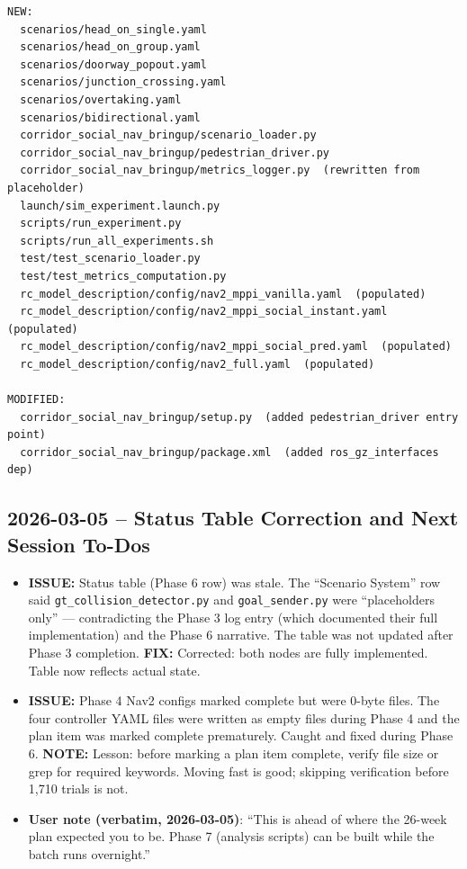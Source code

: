 \documentclass[11pt]{article}
\newcommand{\logentry}[1]{\subsection*{#1}}
\newcommand{\issue}[1]{\textcolor{issuered}{\textbf{ISSUE:} #1}}
\newcommand{\fix}[1]{\textcolor{fixgreen}{\textbf{FIX:} #1}}
\newcommand{\note}[1]{\textcolor{notblue}{\textbf{NOTE:} #1}}
\begin{document}
\begin{verbatim}
NEW:
  scenarios/head_on_single.yaml
  scenarios/head_on_group.yaml
  scenarios/doorway_popout.yaml
  scenarios/junction_crossing.yaml
  scenarios/overtaking.yaml
  scenarios/bidirectional.yaml
  corridor_social_nav_bringup/scenario_loader.py
  corridor_social_nav_bringup/pedestrian_driver.py
  corridor_social_nav_bringup/metrics_logger.py  (rewritten from placeholder)
  launch/sim_experiment.launch.py
  scripts/run_experiment.py
  scripts/run_all_experiments.sh
  test/test_scenario_loader.py
  test/test_metrics_computation.py
  rc_model_description/config/nav2_mppi_vanilla.yaml  (populated)
  rc_model_description/config/nav2_mppi_social_instant.yaml  (populated)
  rc_model_description/config/nav2_mppi_social_pred.yaml  (populated)
  rc_model_description/config/nav2_full.yaml  (populated)

MODIFIED:
  corridor_social_nav_bringup/setup.py  (added pedestrian_driver entry point)
  corridor_social_nav_bringup/package.xml  (added ros_gz_interfaces dep)
\end{verbatim}


\logentry{2026-03-05 -- Status Table Correction and Next Session To-Dos}

\begin{itemize}
  \item \issue{Status table (Phase 6 row) was stale.} The ``Scenario System'' row said
    \texttt{gt\_collision\_detector.py} and \texttt{goal\_sender.py} were ``placeholders
    only'' --- contradicting the Phase 3 log entry (which documented their full
    implementation) and the Phase 6 narrative. The table was not updated after Phase 3
    completion. \fix{Corrected: both nodes are fully implemented. Table now reflects
    actual state.}

  \item \issue{Phase 4 Nav2 configs marked complete but were 0-byte files.}
    The four controller YAML files were written as empty files during Phase 4 and the
    plan item was marked complete prematurely. Caught and fixed during Phase 6.
    \note{Lesson: before marking a plan item complete, verify file size or grep for
    required keywords. Moving fast is good; skipping verification before 1,710 trials
    is not.}

  \item \textbf{User note (verbatim, 2026-03-05)}: ``This is ahead of where the 26-week
    plan expected you to be. Phase 7 (analysis scripts) can be built while the batch
    runs overnight.''
\end{itemize}
\end{document}
